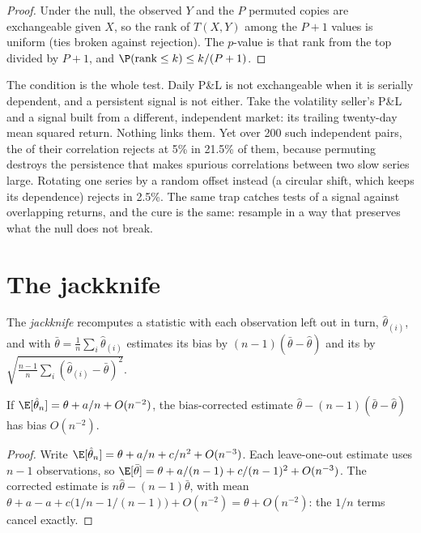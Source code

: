 \begin{proof}
Under the null, the observed $Y$ and the $P$ permuted copies are exchangeable given $X$, so the rank of $T(X, Y)$ among the $P + 1$
values is uniform (ties broken against rejection). The $p$-value is that rank from the top divided by $P + 1$, and $\P(\text{rank} \le
k) \le k/(P + 1)$.
\end{proof}

The condition is the whole test. Daily P\&L is not exchangeable when it is serially dependent, and a persistent signal is not either.
Take the volatility seller's P\&L and a signal built from a different, independent market: its trailing twenty-day mean squared return.
Nothing links them. Yet over 200 such independent pairs, the  of their correlation rejects at 5\% in 21.5\% of them,
because permuting destroys the persistence that makes spurious correlations between two slow series large. Rotating one series by a
random offset instead (a circular shift, which keeps its dependence) rejects in 2.5\%. The same trap catches tests of a signal against
overlapping returns, and the cure is the same: resample in a way that preserves what the null does not break.

\section{The jackknife}

\begin{definition}[Jackknife]\label{def:qm:resampling:jackknife}
The \emph{jackknife} recomputes a statistic with each observation left out in turn, $\hat\theta_{(i)}$, and with $\bar\theta
= \frac1n\sum_i\hat\theta_{(i)}$ estimates its bias by $(n - 1)(\bar\theta - \hat\theta)$ and its  by
$\sqrt{\frac{n-1}n\sum_i(\hat\theta_{(i)} - \bar\theta)^2}$.
\end{definition}

\begin{proposition}\label{prop:qm:resampling:jack}
If $\E[\hat\theta_n] = \theta + a/n + O(n^{-2})$, the bias-corrected estimate $\hat\theta - (n - 1)(\bar\theta - \hat\theta)$ has bias
$O(n^{-2})$.
\end{proposition}

\begin{proof}
Write $\E[\hat\theta_n] = \theta + a/n + c/n^2 + O(n^{-3})$. Each leave-one-out estimate uses $n - 1$ observations, so $\E[\bar\theta] =
\theta + a/(n - 1) + c/(n - 1)^2 + O(n^{-3})$. The corrected estimate is $n\hat\theta - (n - 1)\bar\theta$, with mean $\theta + a - a +
c\bigl(1/n - 1/(n - 1)\bigr) + O(n^{-2}) = \theta + O(n^{-2})$: the $1/n$ terms cancel exactly.
\end{proof}

